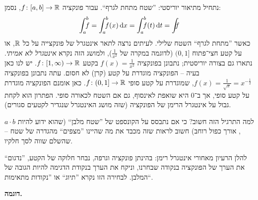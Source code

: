 \documentclass[name=רשימות חדו''א 2א]{../../../tex/classes/noChapterMegasumPreamble}
\newcommand\Is{\dequad \ }
\begin{document}
	נתחיל מתיאור יוריסטי: ''שטח מתחת לגרף``. עבור פונקציה $f \colon [a, b] \to \mathbb{R}$, נסמן:
	\[ \int^{b}_a \dequad \ f = \int^{b}_a \dequad\ f(x)\dx = \int^{b}_a \dequad \ f(t) \dt = \int \Is f \]
	כאשר ''מתחת לגרף`` השטח שלילי. לעיתים נרצה לתאר אינטגרל של פונקצייה על כל $\mathbb{R}$, או על קטע חצי־פתוח $(0, 1]$ (לדוגמה במקרה של $\frac{1}{x^{2}}$), ולמושג הזה נקרא \textit{אינטגרל לא אמיתי}. 
	נתארו גם בצורה יוריסטית; נתבונן בפונקציה $f(x) = \frac{1}{x^2}$ בקטע $f \colon [1, \infty) \to \mathbb{R}$. יש לנו כאן בעיה – הפונקציה מוגדרת על קטע (קרן) לא חסום. עתה נתבונן בפונקציה $f(x) = \frac{1}{\sqrt x} = x^{-\frac{1}{2}}$, שמוגדרת על קטע סופי $f \colon (0, 1] \to \mathbb{R}$. כאן אומנם הפונקציה מוגדרת על קטע סופי, אך ב־$0$ היא שואפת לאינסוף, גם אם השטח לכאורה סופי. הפתרון הוא לקחת גבול על אינטגרל הרימן של הפונקציה (שזה מושג האינטגרל שנגדיר לקטעים סגורים).

	למה התרגיל הזה חשוב? כי אם נתבסס על הקונספט של ''שטח מלבן`` (שהוא ידוע להיות $a \cdot b$, אורך כפול רוחב) חשוב לראות שזה מכבד את מה שהיינו ''מצפים`` מהגדרה של שטח – שהשלם שווה לסך חלקיו.

	להלן הרעיון מאחורי אינטגרל רימן: בהינתן פונקציה וגרפה, נבחר חלוקה של הקטע, ''נדגום`` את הערך של הפונקציה בנקודה שבחרנו, וניקח את הערך בנקודת הדגימה להיות הגובה של המלבן. לבחירה הזו נקרא ''תיוג`` או ''נקודות מתאימות``.


	\textbf{דוגמה. }
	

\end{document}
